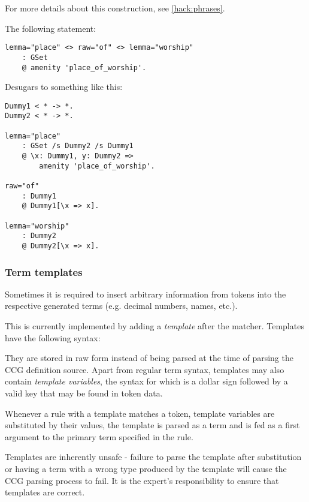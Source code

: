 \documentclass[main.tex]{subfiles}
\begin{document}
For more details about this construction, see \cref{hack:phrases}.

\begin{example}
The following statement:
\begin{lstlisting}
lemma="place" <> raw="of" <> lemma="worship"
    : GSet
    @ amenity 'place_of_worship'.
\end{lstlisting}

Desugars to something like this:
\begin{lstlisting}
Dummy1 < * -> *.
Dummy2 < * -> *.

lemma="place"
    : GSet /s Dummy2 /s Dummy1
    @ \x: Dummy1, y: Dummy2 =>
        amenity 'place_of_worship'.

raw="of"
    : Dummy1
    @ Dummy1[\x => x].

lemma="worship"
    : Dummy2
    @ Dummy2[\x => x].
\end{lstlisting}
\end{example}

\subsubsection{Term templates}
Sometimes it is required to insert arbitrary information from tokens into
the respective generated terms (e.g. decimal numbers, names, etc.).

This is currently implemented by adding a \emph{template} after the
matcher. Templates have the following syntax:
\begin{center}
\end{center}

They are stored in raw form instead of being
parsed at the time of parsing the
CCG definition source. Apart from regular term syntax, templates may also
contain \emph{template variables}, the syntax for which is a dollar sign
followed by a valid key that may be found in token data.

Whenever a rule with a template matches a token, template variables are
substituted by their values, the template is parsed as a term and is fed
as a first argument to the primary term specified in the rule.

Templates are inherently unsafe - failure to parse the template after substitution
or having a term with a wrong type produced by the template will cause the
CCG parsing process to fail. It is the expert's responsibility to ensure that
templates are correct.
\end{document}
